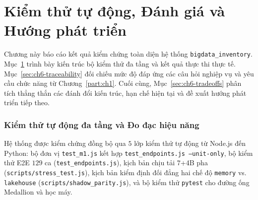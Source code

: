 \part{Kiểm thử tự động, Đánh giá và Hướng phát triển}
\label{part:ch6}

Chương này báo cáo kết quả kiểm chứng toàn diện hệ thống \texttt{bigdata_inventory}. Mục~\ref{sec:ch6-testing} trình bày kiến trúc bộ kiểm thử đa tầng và kết quả thực thi thực tế. Mục~\ref{sec:ch6-traceability} đối chiếu mức độ đáp ứng các câu hỏi nghiệp vụ và yêu cầu chức năng từ Chương~\ref{part:ch1}. Cuối cùng, Mục~\ref{sec:ch6-tradeoffs} phân tích thẳng thắn các đánh đổi kiến trúc, hạn chế hiện tại và đề xuất hướng phát triển tiếp theo.

\section{Kiểm thử tự động đa tầng và Đo đạc hiệu năng}
\label{sec:ch6-testing}
\noindent
\begin{minipage}[c]{0.6\textwidth}
	\small
	Hệ thống được kiểm chứng đồng bộ qua $5$ lớp kiểm thử tự động từ Node.js đến Python: bộ đơn vị \texttt{test_m1.js} kết hợp \texttt{test_endpoints.js --unit-only}, bộ kiểm thử E2E $129$ ca (\texttt{test_endpoints.js}), kịch bản chịu tải $7$+4B pha (\texttt{scripts/stress_test.js}), kịch bản kiểm định đối đẳng hai chế độ \texttt{memory} vs. \texttt{lakehouse} (\texttt{scripts/shadow_parity.js}), và bộ kiểm thử \texttt{pytest} cho đường ống Medallion và học máy.
\end{minipage}
\hfill
\begin{minipage}[c]{0.4\textwidth}
	\centering
	\label{fig:test_pyramid}
\end{minipage}

